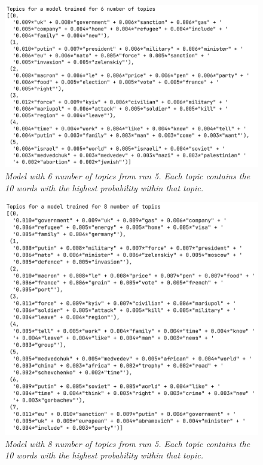 \documentclass[twoside,12pt,a4paper]{article}
\begin{document}
\hfill \break
\begin{figure}[h]
\centering
\includegraphics[scale=0.4]{6_topics.png}
\caption{\textit{Model with 6 number of topics from run 5. Each topic contains the 10 words with the highest probability within that topic.}}
\label{fig:6_topics}
\end{figure}

\begin{figure}[h]
\centering
\includegraphics[scale=0.5]{8_topics.png}
\caption{\textit{Model with 8 number of topics from run 5. Each topic contains the 10 words with the highest probability within that topic.}}
\label{fig:8_topics}
\end{figure}
\end{document}
